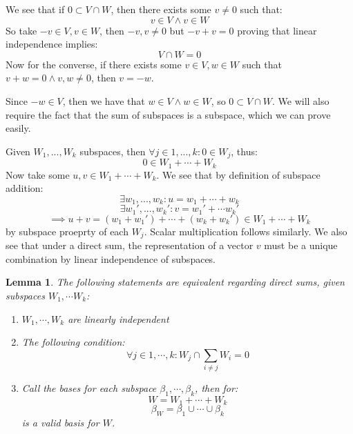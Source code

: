 \documentclass[10pt,letterpaper]{article} %
\newtheorem{lem}{Lemma}[section]
\begin{document}
We see that if $0 \subset V \cap W$, then there exists some $v \neq 0$ such that:
\begin{equation*}
v \in V \land v \in W
\end{equation*}
So take $-v \in V, v \in W$, then $-v, v \neq 0$ but $-v + v = 0$ proving that linear independence implies:
\begin{equation*}
V \cap W = 0
\end{equation*}
Now for the converse, if there exists some $v \in V, w \in W$ such that $v+w = 0 \land v, w \neq 0$, then $v = -w$.

Since $-w \in V$, then we have that $w \in V \land w \in W$, so $0 \subset V \cap W$. We will also require the fact that the sum of subspaces is a subspace, which we can prove easily.

Given $W_1, ..., W_k$ subspaces, then $\forall j \in 1, ..., k: 0 \in W_j$, thus:
\begin{equation*}
0 \in W_1 + \cdots + W_k
\end{equation*}
Now take some $u, v \in W_1 + \cdots + W_k$. We see that by definition of subspace addition:
\begin{equation*}
\exists w_1, ..., w_k: u = w_1 + \cdots + w_k
\end{equation*}
\begin{equation*}
\exists w_1', ..., w_k': v = w_1' + \cdots w_k'
\end{equation*}
\begin{equation*}
\implies u + v = (w_1 + w_1') + \cdots + (w_k + w_k') \in W_1 + \cdots + W_k
\end{equation*}
by subspace proeprty of each $W_j$. Scalar multiplication follows similarly. We also see that under a direct sum, the representation of a vector $v$ must be a unique combination by linear independence of subspaces.
\begin{lem}
The following statements are equivalent regarding direct sums, given subspaces $W_1, \cdots W_k$:
\begin{enumerate}
\item $W_1, \cdots, W_k$ are linearly independent
\item The following condition:
\begin{equation*}
\forall j \in {1, \cdots, k}: W_j \cap \sum_{i \neq j}W_i = 0
\end{equation*}
\item Call the bases for each subspace $\beta_1, \cdots, \beta_k$, then for:
\begin{equation*}
W = W_1 + \cdots + W_k
\end{equation*}
\begin{equation*}
\beta_W = \beta_1 \cup \cdots \cup \beta_k
\end{equation*}
is a valid basis for $W$.
\end{enumerate}
\end{lem}
\end{document}
